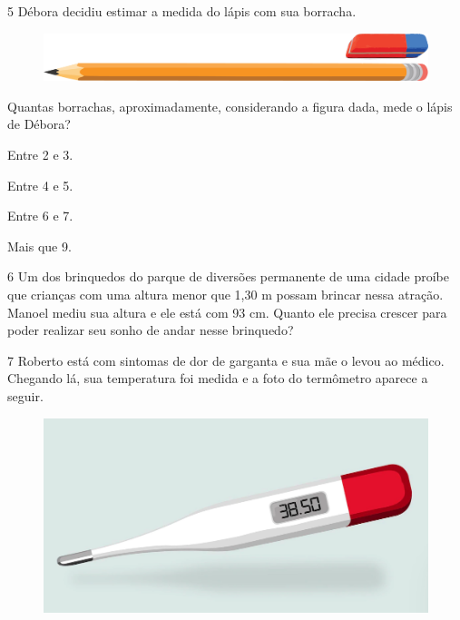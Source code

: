 \num{5} Débora decidiu estimar a medida do lápis com sua borracha.

\begin{figure}[htpb!]
\centering
\includegraphics[width=.5\textwidth]{./media/image46.png}
\end{figure}

Quantas borrachas, aproximadamente, considerando a figura dada, mede o lápis de Débora?

\begin{minipage}{.5\textwidth}
\begin{escolha}
\item
  Entre 2 e 3.
\item
  Entre 4 e 5.
\item
  Entre 6 e 7.
\item
  Mais que 9.
\end{escolha}
\end{minipage}

\num{6} Um dos brinquedos do parque de diversões permanente de uma cidade proíbe
que crianças com uma altura menor que 1,30 m possam brincar nessa
atração. Manoel mediu sua altura e ele está com 93 cm. Quanto ele
precisa crescer para poder realizar seu sonho de andar nesse brinquedo?

\num{7} Roberto está com sintomas de dor de garganta e sua mãe o levou ao
médico. Chegando lá, sua temperatura foi medida e a foto do termômetro
aparece a seguir.

\begin{figure}[htpb!]
\centering
\includegraphics[width=.5\textwidth]{./media/image47.png}
\end{figure}

